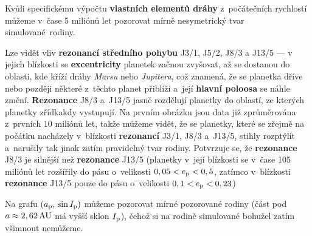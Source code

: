\documentclass{beamer}
\newlength{\vyska}
\newlength{\vyskaB}
\newlength{\main}
\begin{document}
\begin{frame}
\begin{columns}[t]
\begin{column}{\main}
\begin{tcolorbox}[title=Výsledky\phantom{Úy},height=\vyskaB]
Kvůli specifickému výpočtu \textbf{vlastních elementů dráhy} z~počátečních rychlostí můžeme v~čase 5 miliónů let pozorovat mírně nesymetrický tvar simulované~rodiny. 

Lze vidět vliv \textbf{rezonancí středního pohybu} J3/1, J5/2, J8/3 a J13/5 --- v jejich blízkosti se \textbf{excentricity} planetek začnou zvyšovat, až se dostanou do oblasti, kde kříží dráhy \textit{Marsu} nebo \textit{Jupitera}, což znamená, že se planetka dříve nebo později některé z~těchto planet přiblíží a~její \textbf{hlavní poloosa} se náhle změní. \textbf{Rezonance} J8/3 a~J13/5 jasně rozdělují planetky do oblastí, ze kterých planetky zřídkakdy vystupují. Na prvním obrázku jsou data již zprůměrována z~prvních $10$ miliónů let, takže můžeme vidět, že se planetky, které se zřejmě na počátku nacházely v~blízkosti \textbf{rezonancí} J3/1, J8/3 a~J13/5, stihly rozptýlit a~narušily tak jinak zatím pravidelný tvar rodiny. Potvrzuje se, že \textbf{rezonance} J8/3 je silnější než \textbf{rezonance} J13/5 (planetky v~její blízkosti se v~čase 105 miliónů let rozšířily do pásu o~velikosti $0,05<e_{\rm p}<0,5$, zatímco v~blízkosti \textbf{rezonance} J13/5 pouze do pásu o~velikosti $0,1<e_{\rm p}<0,23$)

Na grafu $(a_{\rm p},\,\sin I_{\rm p})$ můžeme pozorovat mírné  pozorované rodiny (část pod $a\approx2,62\,{\rm AU}$ má vyšší sklon $I_{\rm p}$), čehož si na rodině simulované bohužel zatím všimnout nemůžeme.


\end{tcolorbox}
\end{column}
\end{columns}
\end{frame}
\end{document}
